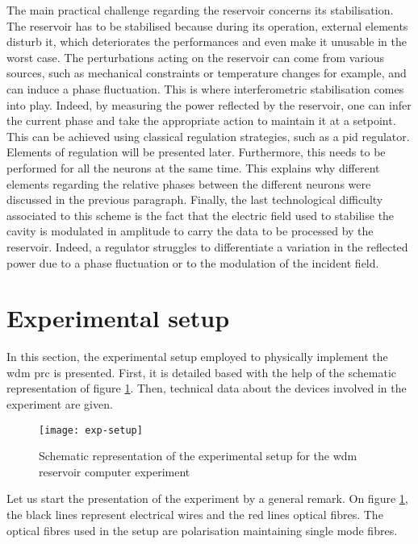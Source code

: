 The main practical challenge regarding the reservoir concerns its stabilisation. The reservoir has to be stabilised because during its operation, external elements disturb it, which deteriorates the performances and even make it unusable in the worst case. The perturbations acting on the reservoir can come from various sources, such as mechanical constraints or temperature changes for example, and can induce a phase fluctuation. This is where interferometric stabilisation comes into play. Indeed, by measuring the power reflected by the reservoir, one can infer the current phase and take the appropriate action to maintain it at a setpoint. This can be achieved using classical regulation strategies, such as a \gls{pid} regulator. Elements of regulation will be presented later. Furthermore, this needs to be performed for all the neurons at the same time. This explains why different elements regarding the relative phases between the different neurons were discussed in the previous paragraph. Finally, the last technological difficulty associated to this scheme is the fact that the electric field used to stabilise the cavity is modulated in amplitude to carry the data to be processed by the reservoir. Indeed, a regulator struggles to differentiate a variation in the reflected power due to a phase fluctuation or to the modulation of the incident field.


\section{Experimental setup}

In this section, the experimental setup employed to physically implement the \gls{wdm} \gls{prc} is presented. First, it is detailed based with the help of the schematic representation of figure \ref{exp-setup}. Then, technical data about the devices involved in the experiment are given.

\begin{figure}[h]
	\centering
	\texttt{[image: exp-setup]}
	\caption{Schematic representation of the experimental setup for the \gls{wdm} reservoir computer experiment}
	\label{exp-setup}
\end{figure}

Let us start the presentation of the experiment by a general remark. On figure \ref{exp-setup}, the black lines represent electrical wires and the red lines optical fibres. The optical fibres used in the setup are polarisation maintaining single mode fibres.

